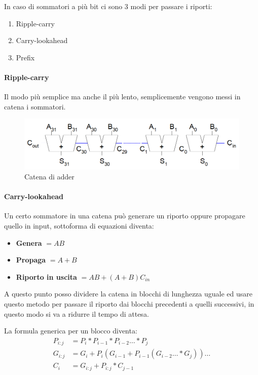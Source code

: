 \documentclass{article}
\begin{document}
In caso di sommatori a più bit ci sono 3 modi per passare i riporti:
\begin{enumerate}
    \item Ripple-carry
    \item Carry-lookahead
    \item Prefix
\end{enumerate}

\newpage

\paragraph{Ripple-carry}

Il modo più semplice ma anche il più lento, semplicemente vengono messi in catena i sommatori.

\begin{figure}[ht]
    \centering
    \includegraphics[width=\linewidth]{adder_chain.png}
    \caption{Catena di adder}
    \label{fig:adder_chain}
\end{figure}

\paragraph{Carry-lookahead}

Un certo sommatore in una catena può generare un riporto oppure propagare quello in input, sottoforma di equazioni diventa:
\begin{itemize}
    \item \textbf{Genera} $= AB$
    \item \textbf{Propaga} $= A+B$
    \item \textbf{Riporto in uscita} $= AB+(A+B)C_{in}$
\end{itemize}

\vspace{2pt}

A questo punto posso dividere la catena in blocchi di lunghezza uguale ed usare questo metodo per passare il riporto dai blocchi precedenti a quelli successivi, in questo modo si va a ridurre il tempo di attesa.\newline

La formula generica per un blocco diventa: \begin{align*}
    P_{i:j} &= P_i * P_{i-1} * P_{i-2} \ldots * P_j\\
    G_{i:j} &= G_i + P_i(G_{i-1}+P_{i-1}(G_{i-2}\ldots*G_j))\ldots\\
    C_i &= G_{i:j}+P_{i:j}*C_{j-1}  
\end{align*}
\end{document}
